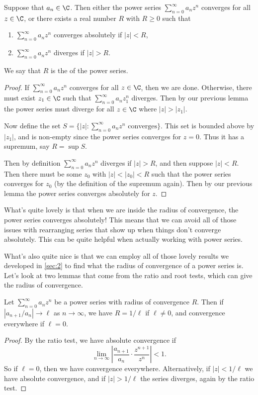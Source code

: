 \documentclass[a4paper]{scrartcl}
\begin{document}
\begin{theorem}
	Suppose that $a_n \in \C$. Then either the power series $\sum_{n = 0}^\infty a_n z^n$ converges for all $z \in \C$, or there exists a real number $R$ with $R \geq 0$ such that
	\begin{enumerate}[label=(\roman*)]
		\item $\sum_{n =0}^\infty a_n z^n$ converges absolutely if $|z| < R$,
		\item $\sum_{n =0}^\infty a_n z^n$ diverges if $|z| > R$.
	\end{enumerate}
	We say that $R$ is the  of the power series.
\end{theorem}
\begin{proof}
	If $\sum_{n = 0}^\infty a_n z^n$ converges for all $z \in \C$, then we are done. Otherwise, there must exist $z_1 \in \C$ such that $\sum_{n = 0}^{\infty} a_n z_1^n$ diverges. Then by our previous lemma the power series must diverge for all $z \in \C$ where $|z| > |z_1|$.

	Now define the set $S = \{|z| : \sum_{n = 0}^\infty a_n z^n \text{ converges}\}$. This set is bounded above by $|z_1|$, and is non-empty since the power series converges for $z = 0$. Thus it has a supremum, say $R = \sup S$. 

	Then by definition $\sum_{n = 0}^{\infty} a_n z^n$ diverges if $|z| > R$, and then suppose $|z| < R$. Then there must be some $z_0$ with $|z| < |z_0| < R$ such that the power series converges for $z_0$ (by the definition of the supremum again). Then by our previous lemma the power series converges absolutely for $z$.
\end{proof}

What's quite lovely is that when we are inside the radius of convergence, the power series converges absolutely! This means that we can avoid all of those issues with rearranging series that show up when things don't converge absolutely. This can be quite helpful when actually working with power series.

What's also quite nice is that we can employ all of those lovely results we developed in \autoref{sec:2} to find what the radius of convergence of a power series is.
Let's look at two lemmas that come from the ratio and root tests, which can give the radius of convergence. 

\begin{lemma}
	Let $\sum_{n = 0}^{\infty} a_n z^n$ be a power series with radius of convergence $R$.
	Then if $|a_{n + 1}/a_n| \rightarrow \ell$ as $n \rightarrow \infty$, we have $R = 1/\ell$ if $\ell \neq 0$, and convergence everywhere if $\ell = 0$.
\end{lemma}
\begin{proof}
	By the ratio test, we have absolute convergence if 
	$$
	\lim_{n \to \infty} \left|\frac{a_{n + 1}}{a_{n}} \cdot \frac{z^{n + 1}}{z^n}\right| < 1.
	$$
	So if $\ell = 0$, then we have convergence everywhere. Alternatively, if $|z| < 1/\ell$ we have absolute convergence, and if $|z| > 1/\ell$ the series diverges, again by the ratio test.
\end{proof}
\end{document}

